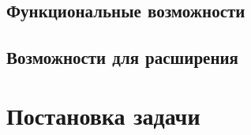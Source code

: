 \subsection{Функциональные возможности}
% 

\subsection{Возможности для расширения}



\section{Постановка задачи}



